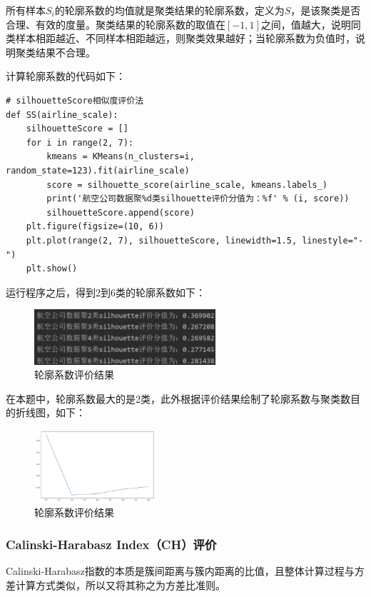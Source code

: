 \documentclass[UTF8,12pt]{article}
\begin{document}
所有样本$S_i$的轮廓系数的均值就是聚类结果的轮廓系数，定义为$S$，是该聚类是否合理、有效的度量。聚类结果的轮廓系数的取值在$[-1,1]$之间，值越大，说明同类样本相距越近、不同样本相距越远，则聚类效果越好；当轮廓系数为负值时，说明聚类结果不合理。

计算轮廓系数的代码如下：

\begin{lstlisting}[title=轮廓系数评价,frame=shadowbox]
    # silhouetteScore相似度评价法
def SS(airline_scale):
    silhouetteScore = []
    for i in range(2, 7):
        kmeans = KMeans(n_clusters=i, random_state=123).fit(airline_scale)
        score = silhouette_score(airline_scale, kmeans.labels_)
        print('航空公司数据聚%d类silhouette评价分值为：%f' % (i, score))
        silhouetteScore.append(score)
    plt.figure(figsize=(10, 6))
    plt.plot(range(2, 7), silhouetteScore, linewidth=1.5, linestyle="-")
    plt.show()
\end{lstlisting}

运行程序之后，得到2到6类的轮廓系数如下：
\begin{figure}[htbp]
    \centering
    \includegraphics[width=0.6\textwidth]{img/12.png}
    \caption{轮廓系数评价结果}
\end{figure}

在本题中，轮廓系数最大的是2类，此外根据评价结果绘制了轮廓系数与聚类数目的折线图，如下：
\begin{figure}[htbp]
    \centering
    \includegraphics[width=0.4\textwidth]{img/13.png}
    \caption{轮廓系数评价结果}
\end{figure}

\subsubsection{Calinski-Harabasz Index（CH）评价}

Calinski-Harabasz指数的本质是簇间距离与簇内距离的比值，且整体计算过程与方差计算方式类似，所以又将其称之为方差比准则。
\end{document}
